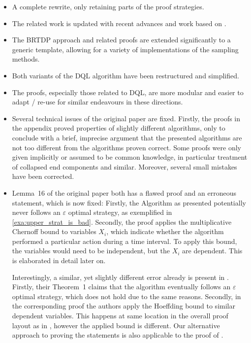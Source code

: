 \documentclass{article}
\begin{document}
\begin{itemize}
	\item
	A complete rewrite, only retaining parts of the proof strategies.

	\item
	The related work is updated with recent advances and work based on \cite{DBLP:conf/atva/BrazdilCCFKKPU14}.

	\item
	The BRTDP approach and related proofs are extended significantly to a generic template, allowing for a variety of implementations of the sampling methods.

	\item
	Both variants of the DQL algorithm have been restructured and simplified.

	\item
	The proofs, especially those related to DQL, are more modular and easier to adapt / re-use for similar endeavours in these directions.

	\item
	Several technical issues of the original paper are fixed.
	Firstly, the proofs in the appendix proved properties of slightly different algorithms, only to conclude with a brief, imprecise argument that the presented algorithms are not too different from the algorithms proven correct.
	Some proofs were only given implicitly or assumed to be common knowledge, in particular treatment of collapsed end components and similar.
	Moreover, several small mistakes have been corrected.

	\item
	Lemma~16 of the original paper both has a flawed proof and an erroneous statement, which is now fixed:
	Firstly, the Algorithm as presented potentially never follows an $\varepsilon$ optimal strategy, as exemplified in \cref{exa:upper_strat_is_bad}.
	Secondly, the proof applies the multiplicative Chernoff bound to variables $X_i$, which indicate whether the algorithm performed a particular action during a time interval.
	To apply this bound, the variables would need to be independent, but the $X_i$ are dependent.
	This is elaborated in detail later on.

	Interestingly, a similar, yet slightly different error already is present in \cite{DBLP:conf/icml/StrehlLWLL06}.
	Firstly, their Theorem~1 claims that the algorithm eventually follows an $\varepsilon$ optimal strategy, which does not hold due to the same reasons.
	Secondly, in the corresponding proof the authors apply the Hoeffding bound to similar dependent variables.
	This happens at same location in the overall proof layout as in \cite{DBLP:conf/atva/BrazdilCCFKKPU14}, however the applied bound is different.
	Our alternative approach to proving the statements is also applicable to the proof of \cite{DBLP:conf/icml/StrehlLWLL06}.
\end{itemize}
\end{document}
